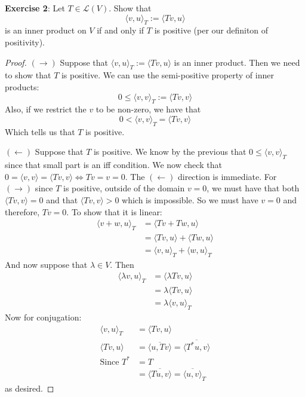 \documentclass{article}
\begin{document}
\textbf{Exercise 2}: Let $T \in \mathcal{L}(V)$. Show that 
\begin{equation*}
	\langle v, u \rangle_{T} := \langle Tv, u \rangle
\end{equation*}
is an inner product on $V$ if and only if $T$ is positive (per our definiton of positivity).

\begin{proof}
	$(\rightarrow)$ Suppose that $\langle v, u \rangle_{T} := \langle Tv, u \rangle$ is an inner product. Then we need to show that $T$ is positive. We can use the semi-positive property of inner products:
	\begin{equation*}
		0 \leq \langle v, v \rangle_{T} := \langle Tv, v \rangle
	\end{equation*}
	Also, if we restrict the $v$ to be non-zero, we have that 
	\begin{equation*}
		0 < \langle v, v \rangle_{T} = \langle Tv, v \rangle
	\end{equation*}
	Which tells us that $T$ is positive. 

	$(\leftarrow)$ Suppose that $T$ is positive. We know by the previous that $0 \leq \langle v, v \rangle_{T}$ since that small part is an iff condition. We now check that $0 = \langle v, v \rangle = \langle Tv, v \rangle \iff Tv = v = 0$. The $(\leftarrow)$ direction is immediate. For $(\rightarrow)$ since $T$ is positive, outside of the domain $v = 0$, we must have that both $\langle Tv, v \rangle = 0$ and that $\langle Tv, v \rangle > 0$ which is impossible. So we must have $v = 0$ and therefore, $Tv = 0$. To show that it is linear:
	\begin{align*}
		\langle v + w, u \rangle_{T} &= \langle Tv + Tw, u \rangle \\
				    &= \langle Tv, u \rangle + \langle Tw, u \rangle \\
				    &= \langle v, u \rangle_{T} + \langle w, u \rangle_{T}
	\end{align*}
	And now suppose that $\lambda \in V$. Then 
	\begin{align*}
		\langle \lambda{v}, u \rangle_{T} &= \langle \lambda Tv, u \rangle \\
					 &= \lambda\langle Tv, u \rangle \\
					 &= \lambda\langle v, u \rangle_{T}
	\end{align*}
	Now for conjugation:
	\begin{align*}
		\langle v, u \rangle_{T} &= \langle Tv, u \rangle \\
		\langle Tv, u \rangle &= \overline{\langle u, Tv \rangle} = \overline{\langle T^{*}u, v \rangle} \\
		\text{Since } T^{*} &= T \\
				    &= \overline{\langle Tu, v \rangle} = \overline{\langle u,v \rangle}_{T}
	\end{align*}
	as desired.
\end{proof}
\end{document}
